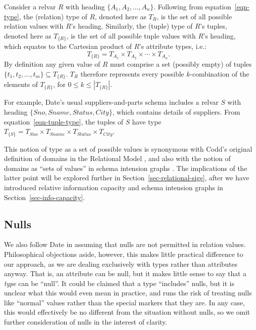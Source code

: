 \documentclass{sig-alternate-05-2015}
\newcommand{\Sno}{\ensuremath{\mathit{Sno}}}
\newcommand{\Sname}{\ensuremath{\mathit{Sname}}}
\newcommand{\Status}{\ensuremath{\mathit{Status}}}
\newcommand{\City}{\ensuremath{\mathit{City}}}
\newcommand{\T}[1]{\ensuremath{T_{#1}}}
\newcommand{\TT}[1]{\ensuremath{T_{\{#1\}}}}
\newcommand{\TSSC}{\ensuremath{\T{\Sname} \times \T{\Status} \times \T{\City}}}
\begin{document}
Consider a relvar \(R\) with heading \(\{A_{1}, A_{2}, \dotsc, A_{n}\}\). Following from equation~\ref{eqn-type}, the (relation) type of \(R\), denoted here as \(\T{R}\), is the set of all possible relation values with \(R\)'s heading. Similarly, the (tuple) type of \(R\)'s tuples, denoted here as \TT{R}, is the set of all possible tuple values with \(R\)'s heading, which equates to the Cartesian product of \(R\)'s attribute types, i.e.:
\begin{equation}\label{eqn-tuple-type}
\TT{R} = \T{A_{1}} \times \T{A_{2}} \times\dotsb\times \T{A_{n}}\text{.}
\end{equation}
By definition any given value of \(R\) must comprise a set (possibly empty) of tuples \(\{t_{1}, t_{2}, \dotsc, t_{m}\} \subseteq \TT{R}\). \(\T{R}\) therefore represents every possible \(k\)-combination of the elements of \TT{R}, for \(0 \le k \le \left|\TT{R}\right|\).

For example, Date's usual suppliers-and-parts schema \cite{Date.C-2013a-View} includes a relvar \(S\) with heading \(\{\Sno, \Sname, \Status, \City\}\), which contains details of suppliers. From equation~\ref{eqn-tuple-type}, the tuples of \(S\) have type \(\TT{S} = \T{\Sno} \times \TSSC\).

This notion of type as a set of possible values is synonymous with Codd's original definition of domains in the Relational Model \cite{Codd.E-1970a-Relational,Date.C-2012a-SQL-and-Relational}, and also with the notion of domains as ``sets of values'' in schema intension graphs \cite{Miller.R-1994a-Schema,Miller.R-1994a-SIG}. The implications of the latter point will be explored further in Section~\ref{sec-relational-sigs}, after we have introduced relative information capacity and schema intension graphs in Section~\ref{sec-info-capacity}.




\subsection{Nulls}

\noindent We also follow Date in assuming that nulls are not permitted in relation values. Philosophical objections aside, however, this makes little practical difference to our approach, as we are dealing exclusively with types rather than attributes anyway. That is, an attribute can be null, but it makes little sense to say that a \emph{type} can be ``null''. It could be claimed that a type ``includes'' nulls, but it is unclear what this would even mean in practice, and runs the risk of treating nulls like ``normal'' values rather than the special markers that they are. In any case, this would effectively be no different from the situation without nulls, so we omit further consideration of nulls in the interest of clarity.
\end{document}
